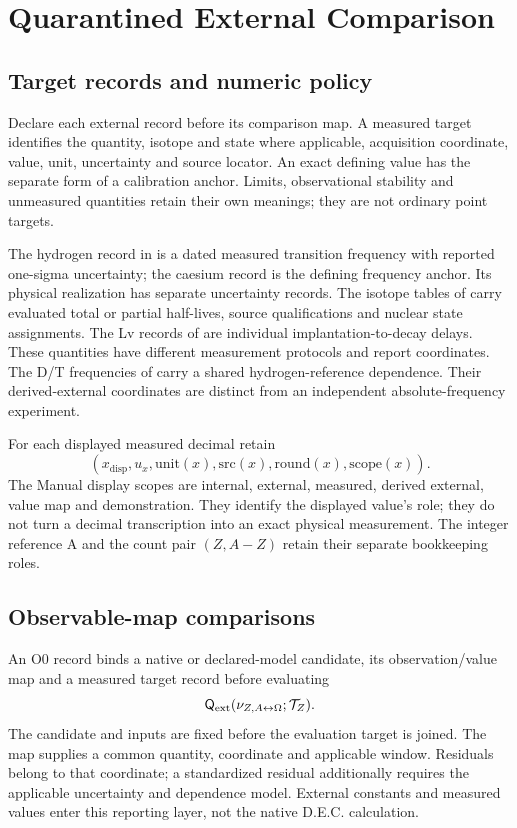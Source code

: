 \section{Quarantined External Comparison}\label{manual2:app:quarantined-external}

\subsection{Target records and numeric policy}\label{manual2:app:qext-scope}
Declare each external record before its comparison map. A measured target
identifies the quantity, isotope and state where applicable, acquisition
coordinate, value, unit, uncertainty and source locator. An exact defining
value has the separate form of a calibration anchor. Limits, observational
stability and unmeasured quantities retain their own meanings; they are not
ordinary point targets.

The hydrogen record in  is a dated measured
transition frequency with reported one-sigma uncertainty; the caesium record
is the defining frequency anchor. Its physical realization has separate
uncertainty records. The isotope tables of 
carry evaluated total or partial half-lives, source qualifications and nuclear
state assignments. The Lv records of  are
individual implantation-to-decay delays. These quantities have different
measurement protocols and report coordinates.
The D/T frequencies of  carry a shared
hydrogen-reference dependence. Their derived-external coordinates are distinct
from an independent absolute-frequency experiment.

For each displayed measured decimal retain
\begin{equation}
(x_{\mathrm{disp}},u_x,\mathrm{unit}(x),\mathrm{src}(x),\mathrm{round}(x),\mathrm{scope}(x)).
\label{eq:manual2-decimal-precision}
\end{equation}
The Manual display scopes are internal, external, measured, derived external,
value map and demonstration. They identify the displayed value's role; they
do not turn a decimal transcription into an exact physical measurement.
The integer reference A and the count pair \((Z,A-Z)\) retain their separate
bookkeeping roles.

\subsection{Observable-map comparisons}\label{manual2:app:qext-audit}
An O0 record binds a native or declared-model candidate, its observation/value
map and a measured target record before evaluating
\begin{equation}
\mathsf{Q}_{\mathrm{ext}}(\nu_{Z,A{\leftrightarrow}\Omega};\mathcal T_Z).
\label{eq:manual2-qext}
\end{equation}
The candidate and inputs are fixed before the evaluation target is joined.
The map supplies a common quantity, coordinate and applicable window. Residuals
belong to that coordinate; a standardized residual additionally requires the
applicable uncertainty and dependence model. External constants and measured
values enter this reporting layer, not the native D.E.C. calculation.

